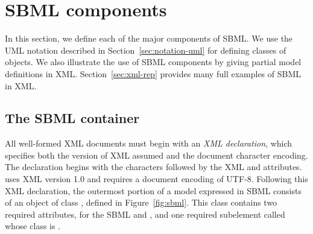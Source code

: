 
\section{SBML components}
\label{sec:elements}

In this section, we define each of the major components of SBML.
We use the UML notation described in
Section~\ref{sec:notation-uml} for defining classes of objects.
We also illustrate the use of SBML components by giving partial
model definitions in XML.  Section~\ref{sec:xml-rep} provides many
full examples of SBML in XML.


\subsection{The SBML container}
\label{sec:sbml}

All well-formed XML documents must begin with an \emph{XML
  declaration}, which specifies both the version of XML assumed
and the document character encoding.  The declaration begins with
the characters  followed by the XML 
and  attributes.  \sbmltwo uses XML version 1.0
and requires a document encoding of UTF-8.  Following this XML
declaration, the outermost portion of a model expressed in SBML
\thisLV consists of an object of class \Sbml, defined in
Figure~\ref{fig:sbml}.  This class contains two required
attributes, for the SBML  and , and
one required subelement called  whose class is
\Model.

